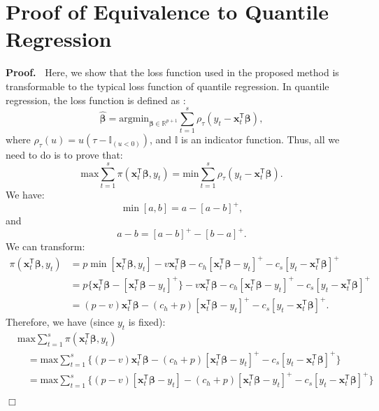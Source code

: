 \documentclass[a4paper,11pt]{article}
\newenvironment{proof}
 {\begin{trivlist} \item[] {\bf Proof.\ }}{\hfill$\Box$ \end{trivlist}}
\begin{document}
\section{Proof of Equivalence to Quantile Regression}
\label{app:C}
\begin{proof}
Here, we show that the loss function used in the proposed method is transformable to the typical loss function of quantile regression. In quantile regression, the loss function is defined as \cite{KH01}:
\[
    \hat{\boldsymbol{\beta}}=\text{argmin}_{\boldsymbol{\beta}\in \mathbb{R}^{p+1}}\displaystyle\sum_{t=1}^s\rho_{\tau}(y_t-\mathbf{x}_t^{\mathsf{T}}\boldsymbol{\beta}),
\]
where $\displaystyle \rho_{\tau}(u)=u(\tau-\mathbb{I}_{(u<0)})$, and $\mathbb{I}$ is an indicator function. Thus, all we need to do is to prove that:
\[
    \text{max}\displaystyle\sum_{t=1}^s{\pi(\mathbf{x}_t^{\mathsf{T}}\boldsymbol{\beta},y_t)}=\text{min}\displaystyle\sum_{t=1}^s\rho_{\tau}(y_t-\mathbf{x}_t^{\mathsf{T}}\boldsymbol{\beta}).
\]
We have:
\[
    \min[a,b]=a-[a-b]^+,
\]
and
\[
    a-b=[a-b]^+-[b-a]^+.
\]
We can transform:
\[
    \begin{aligned}
        \pi(\mathbf{x}_t^{\mathsf{T}}\boldsymbol{\beta},y_t)
        &=p\min[\mathbf{x}_t^{\mathsf{T}}\boldsymbol{\beta},y_t]-v\mathbf{x}_t^{\mathsf{T}}\boldsymbol{\beta}-c_h[\mathbf{x}_t^{\mathsf{T}}\boldsymbol{\beta}-y_t]^+-c_s[y_t-\mathbf{x}_t^{\mathsf{T}}\boldsymbol{\beta}]^+\\
        &=p\{\mathbf{x}_t^{\mathsf{T}}\boldsymbol{\beta}-[\mathbf{x}_t^{\mathsf{T}}\boldsymbol{\beta}-y_t]^+\}-v\mathbf{x}_t^{\mathsf{T}}\boldsymbol{\beta}-c_h[\mathbf{x}_t^{\mathsf{T}}\boldsymbol{\beta}-y_t]^+-c_s[y_t-\mathbf{x}_t^{\mathsf{T}}\boldsymbol{\beta}]^+\\
        &=(p-v)\mathbf{x}_t^{\mathsf{T}}\boldsymbol{\beta}-(c_h+p)[\mathbf{x}_t^{\mathsf{T}}\boldsymbol{\beta}-y_t]^+-c_s[y_t-\mathbf{x}_t^{\mathsf{T}}\boldsymbol{\beta}]^+.
    \end{aligned}
\]
Therefore, we have (since $y_t$ is fixed):
\[
    \begin{aligned}
        &\text{max}\displaystyle\sum_{t=1}^s{\pi(\mathbf{x}_t^{\mathsf{T}}\boldsymbol{\beta},y_t)}\\
        &\quad=\text{max}\displaystyle\sum_{t=1}^s\{(p-v)\mathbf{x}_t^{\mathsf{T}}\boldsymbol{\beta}-(c_h+p)[\mathbf{x}_t^{\mathsf{T}}\boldsymbol{\beta}-y_t]^+-c_s[y_t-\mathbf{x}_t^{\mathsf{T}}\boldsymbol{\beta}]^+\}\\
        &\quad=\text{max}\displaystyle\sum_{t=1}^s\{(p-v)[\mathbf{x}_t^{\mathsf{T}}\boldsymbol{\beta}-y_t]-(c_h+p)[\mathbf{x}_t^{\mathsf{T}}\boldsymbol{\beta}-y_t]^+-c_s[y_t-\mathbf{x}_t^{\mathsf{T}}\boldsymbol{\beta}]^+\}\\

\end{aligned}\]
\end{proof}
\end{document}
